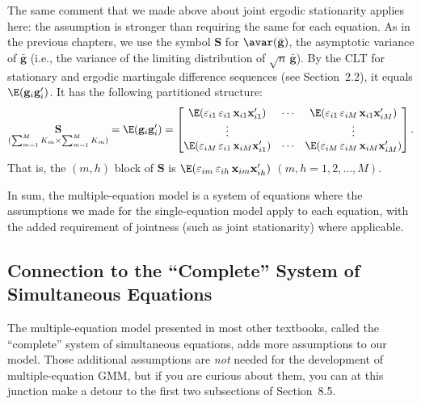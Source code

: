 The same comment that we made above about joint ergodic stationarity applies
here: the assumption is stronger than requiring the same for each equation. As in
the previous chapters, we use the symbol $\mathbf{S}$ for $\avar(\bar{\mathbf{g}})$,
the asymptotic variance of $\bar{\mathbf{g}}$ (i.e., the variance of the limiting distribution
of $\sqrt{n}\, \bar{\mathbf{g}}$). By the CLT for stationary and ergodic martingale difference
sequences (see Section~2.2), it equals $\E(\mathbf{g}_i \mathbf{g}_i')$.
It has the following partitioned structure:
\begin{equation}
\underset{(\sum_{m=1}^{M} K_m \times \sum_{m=1}^{M} K_m)}{\mathbf{S}}
= \E(\mathbf{g}_i \mathbf{g}_i')
= \begin{bmatrix}
\E(\varepsilon_{i1}\, \varepsilon_{i1}\, \mathbf{x}_{i1} \mathbf{x}_{i1}') & \cdots &
\E(\varepsilon_{i1}\, \varepsilon_{iM}\, \mathbf{x}_{i1} \mathbf{x}_{iM}') \\
\vdots & & \vdots \\
\E(\varepsilon_{iM}\, \varepsilon_{i1}\, \mathbf{x}_{iM} \mathbf{x}_{i1}') & \cdots &
\E(\varepsilon_{iM}\, \varepsilon_{iM}\, \mathbf{x}_{iM} \mathbf{x}_{iM}')
\end{bmatrix}.
\label{eq:4.1.11}
\end{equation}
That is, the $(m, h)$ block of $\mathbf{S}$ is
$\E(\varepsilon_{im}\, \varepsilon_{ih}\, \mathbf{x}_{im} \mathbf{x}_{ih}')$
$(m, h = 1, 2, \ldots, M)$.

In sum, the multiple-equation model is a system of equations where the assumptions
we made for the single-equation model apply to each equation, with the added
requirement of jointness (such as joint stationarity) where applicable.

\subsection*{Connection to the ``Complete'' System of Simultaneous Equations}

The multiple-equation model presented in most other textbooks, called the ``complete''
system of simultaneous equations, adds more assumptions to our model.
Those additional assumptions are \textit{not} needed for the development of multiple-equation
GMM, but if you are curious about them, you can at this junction make a
detour to the first two subsections of Section~8.5.

